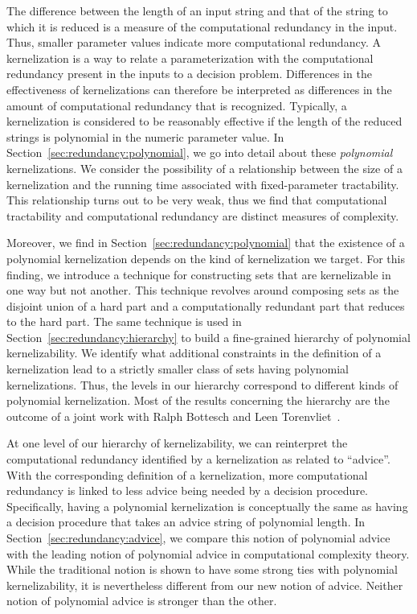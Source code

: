 The difference between the length of an input string and that of the string to which it is reduced is a measure of the computational redundancy in the input.
Thus, smaller parameter values indicate more computational redundancy.
A kernelization is a way to relate a parameterization with the computational redundancy present in the inputs to a decision problem.
Differences in the effectiveness of kernelizations can therefore be interpreted as differences in the amount of computational redundancy that is recognized.
Typically, a kernelization is considered to be reasonably effective if the length of the reduced strings is polynomial in the numeric parameter value.
In Section~\ref{sec:redundancy:polynomial}, we go into detail about these \emph{polynomial} kernelizations.
We consider the possibility of a relationship between the size of a kernelization and the running time associated with fixed-parameter tractability.
This relationship turns out to be very weak, thus we find that computational tractability and computational redundancy are distinct measures of complexity.

Moreover, we find in Section~\ref{sec:redundancy:polynomial} that the existence of a polynomial kernelization depends on the kind of kernelization we target.
For this finding, we introduce a technique for constructing sets that are kernelizable in one way but not another.
This technique revolves around composing sets as the disjoint union of a hard part and a computationally redundant part that reduces to the hard part.
The same technique is used in Section~\ref{sec:redundancy:hierarchy} to build a fine-grained hierarchy of polynomial kernelizability.
We identify what additional constraints in the definition of a kernelization lead to a strictly smaller class of sets having polynomial kernelizations.
Thus, the levels in our hierarchy correspond to different kinds of polynomial kernelization.
Most of the results concerning the hierarchy are the outcome of a joint work with Ralph Bottesch and Leen Torenvliet~\parencite{witteveen2019hierarchy}.

At one level of our hierarchy of kernelizability, we can reinterpret the computational redundancy identified by a kernelization as related to \enquote{advice}.
With the corresponding definition of a kernelization, more computational redundancy is linked to less advice being needed by a decision procedure.
Specifically, having a polynomial kernelization is conceptually the same as having a decision procedure that takes an advice string of polynomial length.
In Section~\ref{sec:redundancy:advice}, we compare this notion of polynomial advice with the leading notion of polynomial advice in computational complexity theory.
While the traditional notion is shown to have some strong ties with polynomial kernelizability, it is nevertheless different from our new notion of advice.
Neither notion of polynomial advice is stronger than the other.

